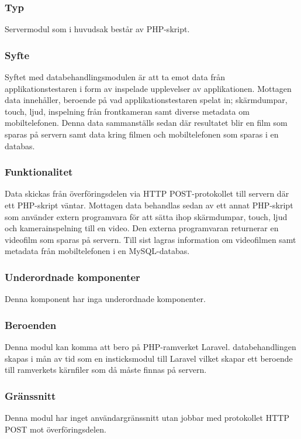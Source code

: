 \subsubsection{Typ}
Servermodul som i huvudsak består av PHP-skript.

\subsubsection{Syfte}
Syftet med databehandlingsmodulen är att ta emot data från applikationstestaren i form av inspelade upplevelser av applikationen. Mottagen data innehåller, beroende på vad applikationstestaren spelat in; skärmdumpar, touch, ljud, inspelning från frontkameran samt diverse metadata om mobiltelefonen. Denna data sammanställs sedan där resultatet blir en film som sparas på servern samt data kring filmen och mobiltelefonen som sparas i en databas.

\subsubsection{Funktionalitet}
Data skickas från överföringsdelen via HTTP POST-protokollet till servern där ett PHP-skript väntar. Mottagen data behandlas sedan av ett annat PHP-skript som använder extern programvara för att sätta ihop skärmdumpar, touch, ljud och kamerainspelning till en video. Den externa programvaran returnerar en videofilm som sparas på servern. Till sist lagras information om videofilmen samt metadata från mobiltelefonen i en MySQL-databas.

\subsubsection{Underordnade komponenter}
Denna komponent har inga underordnade komponenter.

\subsubsection{Beroenden}
Denna modul kan komma att bero på PHP-ramverket Laravel. databehandlingen skapas i mån av tid som en insticksmodul till Laravel vilket skapar ett beroende till ramverkets kärnfiler som då måste finnas på servern.

\subsubsection{Gränssnitt}
Denna modul har inget användargränssnitt utan jobbar med protokollet HTTP POST mot överföringsdelen.

